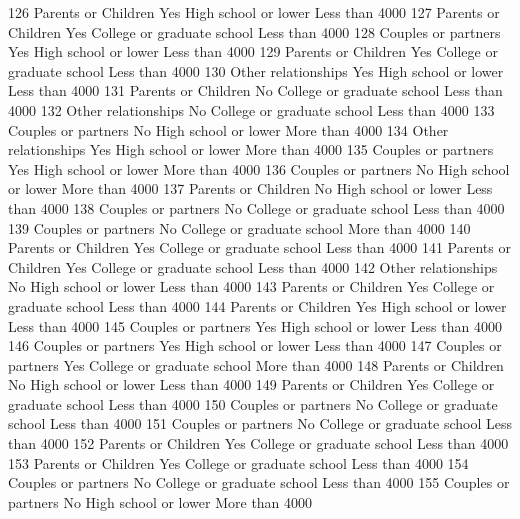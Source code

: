 \documentclass[
  letterpaper,
  DIV=11,
  numbers=noendperiod]{scrreprt}
\newenvironment{Shaded}{\begin{snugshade}}{\end{snugshade}}
\newcommand{\NormalTok}[1]{\textcolor[rgb]{0.00,0.23,0.31}{#1}}
\begin{document}
\begin{Shaded}
\begin{Highlighting}[]
\NormalTok{126 Parents or Children      Yes       High school or lower Less than 4000}
\NormalTok{127 Parents or Children      Yes College or graduate school Less than 4000}
\NormalTok{128 Couples or partners      Yes       High school or lower Less than 4000}
\NormalTok{129 Parents or Children      Yes College or graduate school Less than 4000}
\NormalTok{130 Other relationships      Yes       High school or lower Less than 4000}
\NormalTok{131 Parents or Children       No College or graduate school Less than 4000}
\NormalTok{132 Other relationships       No College or graduate school Less than 4000}
\NormalTok{133 Couples or partners       No       High school or lower More than 4000}
\NormalTok{134 Other relationships      Yes       High school or lower More than 4000}
\NormalTok{135 Couples or partners      Yes       High school or lower More than 4000}
\NormalTok{136 Couples or partners       No       High school or lower More than 4000}
\NormalTok{137 Parents or Children       No       High school or lower Less than 4000}
\NormalTok{138 Couples or partners       No College or graduate school Less than 4000}
\NormalTok{139 Couples or partners       No College or graduate school More than 4000}
\NormalTok{140 Parents or Children      Yes College or graduate school Less than 4000}
\NormalTok{141 Parents or Children      Yes College or graduate school Less than 4000}
\NormalTok{142 Other relationships       No       High school or lower Less than 4000}
\NormalTok{143 Parents or Children      Yes College or graduate school Less than 4000}
\NormalTok{144 Parents or Children      Yes       High school or lower Less than 4000}
\NormalTok{145 Couples or partners      Yes       High school or lower Less than 4000}
\NormalTok{146 Couples or partners      Yes       High school or lower Less than 4000}
\NormalTok{147 Couples or partners      Yes College or graduate school More than 4000}
\NormalTok{148 Parents or Children       No       High school or lower Less than 4000}
\NormalTok{149 Parents or Children      Yes College or graduate school Less than 4000}
\NormalTok{150 Couples or partners       No College or graduate school Less than 4000}
\NormalTok{151 Couples or partners       No College or graduate school Less than 4000}
\NormalTok{152 Parents or Children      Yes College or graduate school Less than 4000}
\NormalTok{153 Parents or Children      Yes College or graduate school Less than 4000}
\NormalTok{154 Couples or partners       No College or graduate school Less than 4000}
\NormalTok{155 Couples or partners       No       High school or lower More than 4000}

\end{Highlighting}
\end{Shaded}
\end{document}
